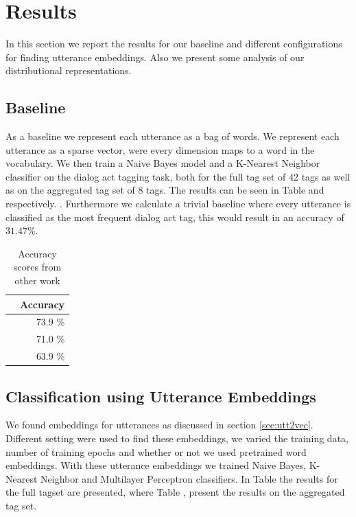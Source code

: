 \section{Results}\label{sec:results}
In this section we report the results for our baseline and different configurations for finding utterance embeddings.
Also we present some analysis of our distributional representations.

\subsection{Baseline}
As a baseline we represent each utterance as a bag of words.
We represent each utterance as a sparse vector, were every dimension maps to a word in the vocabulary.
We then train a Naive Bayes model and a K-Nearest Neighbor classifier on the dialog act tagging task, both for the full tag set of 42 tags as well as on the aggregated tag set of 8 tags.
The results can be seen in Table  and  respectively. .
Furthermore we calculate a trivial baseline where every utterance is classified as the most frequent dialog act tag, this would result in an accuracy of $31.47\%$.

\begin{table}[h]
	\centering

	\begin{tabular}{l|r}
		& \textbf{Accuracy} \\ \hline
		\newcite{kalchbrenner} & 73.9 \%           \\
		\newcite{stolcke2000}  & 71.0 \%           \\
		\newcite{milajevs}     & 63.9 \%          
	\end{tabular}
		\caption{Accuracy scores from other work}
		\label{tab:sota}
\end{table}

\subsection{Classification using Utterance Embeddings}
We found embeddings for utterances as discussed in section \ref{sec:utt2vec}.
Different setting were used to find these embeddings, we varied the training data, number of training epochs and whether or not we used pretrained word embeddings.
With these utterance embeddings we trained Naive Bayes, K-Nearest Neighbor and Multilayer Perceptron classifiers.
In Table  the results for the full tagset are presented, where Table , present the results on the aggregated tag set. 


